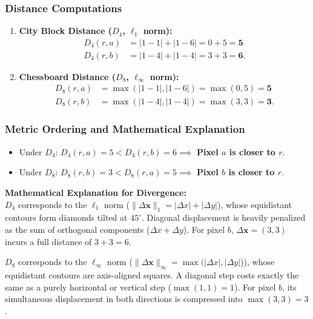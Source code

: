 \documentclass[11pt,a4paper]{article}
\begin{document}
\subsubsection{Distance Computations}
\begin{enumerate}
    \item \textbf{City Block Distance ($D_4$, $\ell_1$ norm):}
    \begin{align}
    D_4(r, a) &= |1 - 1| + |1 - 6| = 0 + 5 = \mathbf{5} \\
    D_4(r, b) &= |1 - 4| + |1 - 4| = 3 + 3 = \mathbf{6}.
    \end{align}
    \item \textbf{Chessboard Distance ($D_8$, $\ell_\infty$ norm):}
    \begin{align}
    D_8(r, a) &= \max(|1 - 1|, |1 - 6|) = \max(0, 5) = \mathbf{5} \\
    D_8(r, b) &= \max(|1 - 4|, |1 - 4|) = \max(3, 3) = \mathbf{3}.
    \end{align}
\end{enumerate}

\subsubsection{Metric Ordering and Mathematical Explanation}
\begin{itemize}
    \item Under $D_4$: $D_4(r, a) = 5 < D_4(r, b) = 6 \implies$ \textbf{Pixel $a$ is closer to $r$}.
    \item Under $D_8$: $D_8(r, b) = 3 < D_8(r, a) = 5 \implies$ \textbf{Pixel $b$ is closer to $r$}.
\end{itemize}
\noindent\textbf{Mathematical Explanation for Divergence:}\\
$D_4$ corresponds to the $\ell_1$ norm ($\|\Delta \mathbf{x}\|_1 = |\Delta x| + |\Delta y|$), whose equidistant contours form diamonds tilted at $45^\circ$. Diagonal displacement is heavily penalized as the sum of orthogonal components ($\Delta x + \Delta y$). For pixel $b$, $\Delta \mathbf{x} = (3, 3)$ incurs a full distance of $3 + 3 = 6$.

$D_8$ corresponds to the $\ell_\infty$ norm ($\|\Delta \mathbf{x}\|_\infty = \max(|\Delta x|, |\Delta y|$)), whose equidistant contours are axis-aligned squares. A diagonal step costs exactly the same as a purely horizontal or vertical step ($\max(1, 1) = 1$). For pixel $b$, its simultaneous displacement in both directions is compressed into $\max(3, 3) = 3$.
\end{document}
